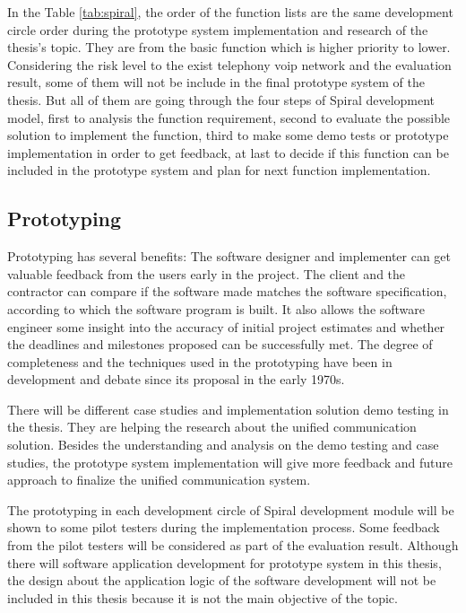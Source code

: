 \par In the Table \ref{tab:spiral}, the order of the function lists are the same development circle order during the prototype system implementation and research of the thesis's topic. They are from the basic function which is higher priority to lower. Considering the risk level to the exist telephony \gls{voip} network and the evaluation result, some of them will not be include in the final prototype system of the thesis. But all of them are going through the four steps of Spiral development model, first to analysis the function requirement, second to evaluate the possible solution to implement the function, third to make some demo tests or prototype implementation in order to get feedback, at last to decide if this function can be included in the prototype system and plan for next function implementation.

\subsection{Prototyping}

\par Prototyping has several benefits: The software designer and implementer can get valuable feedback from the users early in the project. The client and the contractor can compare if the software made matches the software specification, according to which the software program is built. It also allows the software engineer some insight into the accuracy of initial project estimates and whether the deadlines and milestones proposed can be successfully met. The degree of completeness and the techniques used in the prototyping have been in development and debate since its proposal in the early 1970s.\cite{wiki:prototyping}

\par There will be different case studies and implementation solution demo testing in the thesis. They are helping the research about the unified communication solution. Besides the understanding and analysis on the demo testing and case studies, the prototype system implementation will give more feedback and future approach to finalize the unified communication system.

\par The prototyping in each development circle of Spiral development module will be shown to some pilot testers during the implementation process. Some feedback from the pilot testers will be considered as part of the evaluation result. Although there will software application development for prototype system in this thesis, the design about the application logic of the software development will not be included in this thesis because it is not the main objective of the topic.

